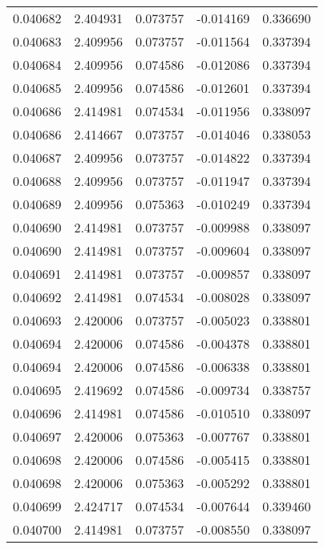 \begin{tabular}{lrrrr}
0.040682    &  2.404931 &  0.073757 & -0.014169 &             0.336690 \\
0.040683    &  2.409956 &  0.073757 & -0.011564 &             0.337394 \\
0.040684    &  2.409956 &  0.074586 & -0.012086 &             0.337394 \\
0.040685    &  2.409956 &  0.074586 & -0.012601 &             0.337394 \\
0.040686    &  2.414981 &  0.074534 & -0.011956 &             0.338097 \\
0.040686    &  2.414667 &  0.073757 & -0.014046 &             0.338053 \\
0.040687    &  2.409956 &  0.073757 & -0.014822 &             0.337394 \\
0.040688    &  2.409956 &  0.073757 & -0.011947 &             0.337394 \\
0.040689    &  2.409956 &  0.075363 & -0.010249 &             0.337394 \\
0.040690    &  2.414981 &  0.073757 & -0.009988 &             0.338097 \\
0.040690    &  2.414981 &  0.073757 & -0.009604 &             0.338097 \\
0.040691    &  2.414981 &  0.073757 & -0.009857 &             0.338097 \\
0.040692    &  2.414981 &  0.074534 & -0.008028 &             0.338097 \\
0.040693    &  2.420006 &  0.073757 & -0.005023 &             0.338801 \\
0.040694    &  2.420006 &  0.074586 & -0.004378 &             0.338801 \\
0.040694    &  2.420006 &  0.074586 & -0.006338 &             0.338801 \\
0.040695    &  2.419692 &  0.074586 & -0.009734 &             0.338757 \\
0.040696    &  2.414981 &  0.074586 & -0.010510 &             0.338097 \\
0.040697    &  2.420006 &  0.075363 & -0.007767 &             0.338801 \\
0.040698    &  2.420006 &  0.074586 & -0.005415 &             0.338801 \\
0.040698    &  2.420006 &  0.075363 & -0.005292 &             0.338801 \\
0.040699    &  2.424717 &  0.074534 & -0.007644 &             0.339460 \\
0.040700    &  2.414981 &  0.073757 & -0.008550 &             0.338097 \\

\end{tabular}
